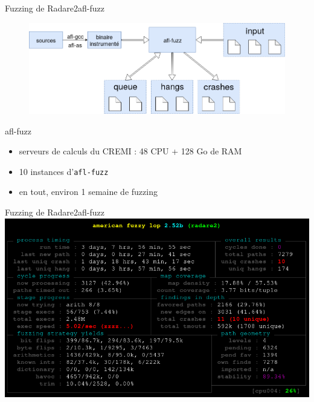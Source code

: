 \begin{frame}{Fuzzing de Radare2}{afl-fuzz}
  \begin{figure}
    \includegraphics[width=0.98\linewidth]{../medias/afl-overview.png}
  \end{figure}

  \pause

  \begin{exampleblock}{afl-fuzz}
    \begin{itemize}
    \item{serveurs de calculs du CREMI : 48 CPU + 128 Go de RAM}
    \item{10 instances d'\lstinline{afl-fuzz}}
    \item{en tout, environ 1 semaine de fuzzing}
    \end{itemize}
  \end{exampleblock}

\end{frame}

\begin{frame}{Fuzzing de Radare2}{afl-fuzz}
  \includegraphics[width=\linewidth]{../medias/afl-fuzz.png}
\end{frame}

